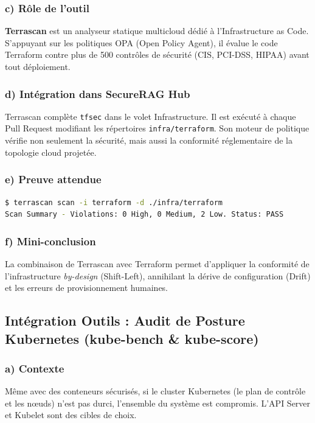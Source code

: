 \subsubsection{c) Rôle de l'outil}
\textbf{Terrascan} est un analyseur statique multicloud dédié à l'Infrastructure as Code. S'appuyant sur les politiques OPA (Open Policy Agent), il évalue le code Terraform contre plus de 500 contrôles de sécurité (CIS, PCI-DSS, HIPAA) avant tout déploiement.

\subsubsection{d) Intégration dans SecureRAG Hub}
Terrascan complète \texttt{tfsec} dans le volet Infrastructure. Il est exécuté à chaque Pull Request modifiant les répertoires \texttt{infra/terraform}. Son moteur de politique vérifie non seulement la sécurité, mais aussi la conformité réglementaire de la topologie cloud projetée.

\subsubsection{e) Preuve attendue}
\begin{lstlisting}[language=bash, caption={Rapport de scan Terrascan sur les modules Terraform}, label={lst:terrascan_proof}]
$ terrascan scan -i terraform -d ./infra/terraform
Scan Summary - Violations: 0 High, 0 Medium, 2 Low. Status: PASS
\end{lstlisting}

\subsubsection{f) Mini-conclusion}
La combinaison de Terrascan avec Terraform permet d'appliquer la conformité de l'infrastructure \textit{by-design} (Shift-Left), annihilant la dérive de configuration (Drift) et les erreurs de provisionnement humaines.

\subsection{Intégration Outils : Audit de Posture Kubernetes (kube-bench \& kube-score)}

\subsubsection{a) Contexte}
Même avec des conteneurs sécurisés, si le cluster Kubernetes (le plan de contrôle et les nœuds) n'est pas durci, l'ensemble du système est compromis. L'API Server et Kubelet sont des cibles de choix.

